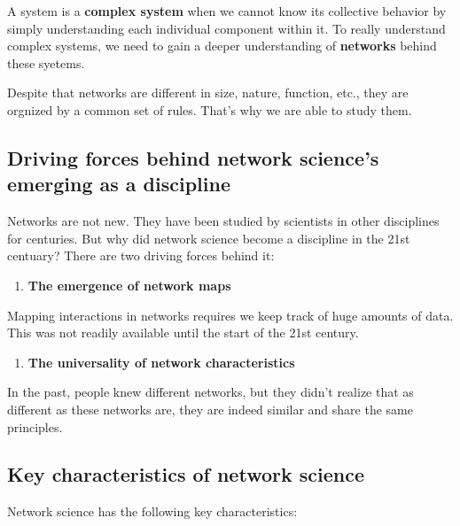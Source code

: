 \documentclass[
]{krantz}
\providecommand{\tightlist}{%
  \setlength{\itemsep}{0pt}\setlength{\parskip}{0pt}}
\begin{document}
A system is a \textbf{complex system} when we cannot know its collective behavior by simply understanding each individual component within it. To really understand complex systems, we need to gain a deeper understanding of \textbf{networks} behind these syetems.

Despite that networks are different in size, nature, function, etc., they are orgnized by a common set of rules. That's why we are able to study them.

\hypertarget{driving-forces-behind-network-sciences-emerging-as-a-discipline}{%
\subsection{Driving forces behind network science's emerging as a discipline}\label{driving-forces-behind-network-sciences-emerging-as-a-discipline}}

Networks are not new. They have been studied by scientists in other disciplines for centuries. But why did network science become a discipline in the 21st centuary? There are two driving forces behind it:

\begin{enumerate}
\def\labelenumi{\arabic{enumi}.}
\tightlist
\item
  \textbf{The emergence of network maps}
\end{enumerate}

Mapping interactions in networks requires we keep track of huge amounts of data. This was not readily available until the start of the 21st century.

\begin{enumerate}
\def\labelenumi{\arabic{enumi}.}
\setcounter{enumi}{1}
\tightlist
\item
  \textbf{The universality of network characteristics}
\end{enumerate}

In the past, people knew different networks, but they didn't realize that as different as these networks are, they are indeed similar and share the same principles.

\hypertarget{key-characteristics-of-network-science}{%
\subsection{Key characteristics of network science}\label{key-characteristics-of-network-science}}

Network science has the following key characteristics:
\end{document}
